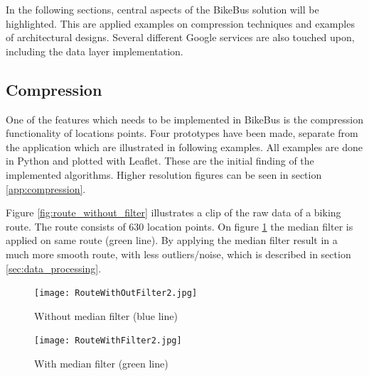 



In the following sections, central aspects of the BikeBus solution will be highlighted. This are applied examples on compression techniques and examples of architectural designs. Several different Google services are also touched upon, including the data layer implementation.




\subsection{Compression}
\label{sec:compression}
One of the features which needs to be implemented in BikeBus is the compression functionality of locations points. Four prototypes have been made, separate from the application which are illustrated in following examples. All examples are done in Python and plotted with Leaflet. These are the initial finding of the implemented algorithms. Higher resolution figures can be seen in section \ref{app:compression}.  

Figure \ref{fig:route_without_filter} illustrates a clip of the raw data of a biking route. The route consists of 630 location points. On figure \ref{fig:route_with_filter} the median filter is applied on same route (green line). By applying the median filter result in a much more smooth route, with less outliers/noise, which is described in section \ref{sec:data_processing}. 
\begin{figure}[H]
\centering
\begin{minipage}{0.49\textwidth}
\centering
    \texttt{[image: RouteWithOutFilter2.jpg]}
    \caption{Without median filter (blue line)}
    \label{fig:route_without_filter}
\end{minipage}\hfill
\begin{minipage}{0.49\textwidth}
\centering
    \texttt{[image: RouteWithFilter2.jpg]}
    \caption{With median filter (green line)}
    \label{fig:route_with_filter}
\end{minipage}
\end{figure}

